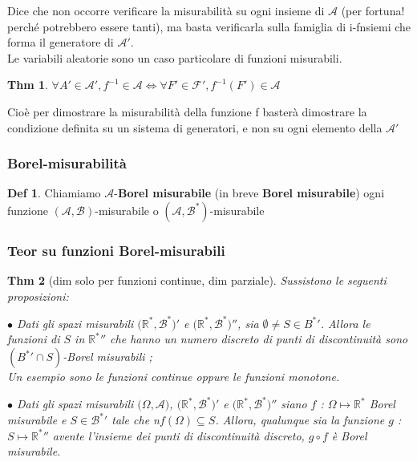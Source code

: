 \documentclass[a4paper,11pt]{article}
\theoremstyle{plain}
\newtheorem{thm}{Thm}[section]
\theoremstyle{definition}
\newtheorem{defn}{Def}[section]
\theoremstyle{remark}
\begin{document}
Dice che non occorre verificare la misurabilità su ogni insieme di $\mathcal{A}$ (per fortuna! perché potrebbero essere tanti), ma basta verificarla sulla famiglia di i-fnsiemi che forma il generatore di $\mathcal{A}'$.\\


\noindent  
Le variabili aleatorie sono un caso particolare di funzioni misurabili.

\noindent
\begin{thm}
$\forall A' \in \mathcal{A}', f^{-1} \in \mathcal{A} \Leftrightarrow  \forall F' \in \mathcal{F}', f^{-1}(F') \in \mathcal{A} $
\end{thm}
\noindent
Cioè per dimostrare la misurabilità della funzione f basterà dimostrare la condizione definita su un sistema di generatori, e non su ogni elemento della $\mathcal{A}'$

\subsubsection{Borel-misurabilità}
\begin{defn}
Chiamiamo $\mathcal{A}$-\textbf{Borel misurabile} (in breve \textbf{Borel misurabile}) ogni funzione $(\mathcal{A},\mathcal{B})$-misurabile o $(\mathcal{A}, \mathcal{B}^{*})$-misurabile
\end{defn}


\subsubsection{Teor su funzioni Borel-misurabili}
\begin{thm} [dim solo per funzioni continue, dim parziale] Sussistono le seguenti proposizioni:

$\bullet$ Dati gli spazi misurabili $(\mathbb{R}^*,\mathcal{B^*)'}$ e $(\mathbb{R}^*,\mathcal{B^*)''}$, sia $\emptyset\neq S\in B^{*}'$. Allora le funzioni di $S$ in $\mathbb{R}^{*}''$ che hanno un numero discreto di  punti di discontinuità sono $(B^{*}'\cap S)$-Borel misurabili  ;\\

Un esempio sono le funzioni continue oppure le funzioni monotone.

$\bullet$ Dati gli spazi misurabili $(\Omega,\mathcal{A)}$, $(\mathbb{R}^*,\mathcal{B^*)}'$ e $(\mathbb{R}^*,\mathcal{B^*)}''$ siano $f$ : $\Omega\mapsto \mathbb{R}^{*}$ Borel misurabile e $S\in \mathcal{B}^{*}'$ tale che n$f(\Omega)\subseteq S$. Allora, qualunque sia la funzione $g$ : $S\mapsto \mathbb{R}^{*}''$ avente l'insieme dei punti di discontinuità discreto,  $g \circ f$ è Borel misurabile.
\end{thm}
\end{document}
